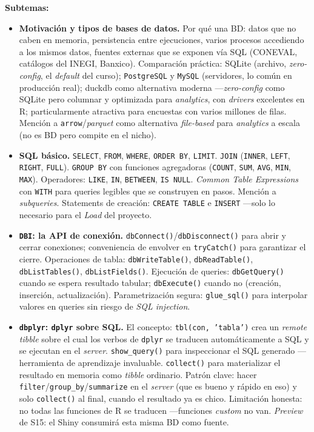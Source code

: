 \documentclass[11pt,letterpaper]{article}
\newcommand{\blue}[1]{{\color{cerulean}#1}}
\begin{document}
\textbf{Subtemas:}

\begin{itemize}[leftmargin=*, itemsep=2pt]
    \item \textbf{Motivación y tipos de bases de datos.} Por qué una BD: datos que no caben en memoria, persistencia entre ejecuciones, varios procesos accediendo a los mismos datos, fuentes externas que se exponen vía SQL (CONEVAL, catálogos del INEGI, Banxico). Comparación práctica: \blue{SQLite} (archivo, \textit{zero-config}, el \textit{default} del curso); \texttt{PostgreSQL} y \texttt{MySQL} (servidores, lo común en producción real); \blue{duckdb} como alternativa moderna ---\textit{zero-config} como SQLite pero columnar y optimizada para \textit{analytics}, con \textit{drivers} excelentes en R; particularmente atractiva para encuestas con varios millones de filas. Mención a \texttt{arrow}/\textit{parquet} como alternativa \textit{file-based} para \textit{analytics} a escala (no es BD pero compite en el nicho).
    \item \textbf{SQL básico.} \texttt{SELECT}, \texttt{FROM}, \texttt{WHERE}, \texttt{ORDER BY}, \texttt{LIMIT}. \texttt{JOIN} (\texttt{INNER}, \texttt{LEFT}, \texttt{RIGHT}, \texttt{FULL}). \texttt{GROUP BY} con funciones agregadoras (\texttt{COUNT}, \texttt{SUM}, \texttt{AVG}, \texttt{MIN}, \texttt{MAX}). Operadores: \texttt{LIKE}, \texttt{IN}, \texttt{BETWEEN}, \texttt{IS NULL}. \textit{Common Table Expressions} con \texttt{WITH} para queries legibles que se construyen en pasos. Mención a \textit{subqueries}. Statements de creación: \texttt{CREATE TABLE} e \texttt{INSERT} ---solo lo necesario para el \textit{Load} del proyecto.
    \item \textbf{\texttt{DBI}: la API de conexión.} \texttt{dbConnect()}/\texttt{dbDisconnect()} para abrir y cerrar conexiones; conveniencia de envolver en \texttt{tryCatch()} para garantizar el cierre. Operaciones de tabla: \texttt{dbWriteTable()}, \texttt{dbReadTable()}, \texttt{dbListTables()}, \texttt{dbListFields()}. Ejecución de queries: \texttt{dbGetQuery()} cuando se espera resultado tabular; \texttt{dbExecute()} cuando no (creación, inserción, actualización). Parametrización segura: \texttt{glue\_sql()} para interpolar valores en queries sin riesgo de \textit{SQL injection}.
    \item \textbf{\texttt{dbplyr}: \texttt{dplyr} sobre SQL.} El concepto: \texttt{tbl(con, 'tabla')} crea un \textit{remote tibble} sobre el cual los verbos de \texttt{dplyr} se traducen automáticamente a SQL y se ejecutan en el \textit{server}. \texttt{show\_query()} para inspeccionar el SQL generado ---herramienta de aprendizaje invaluable. \texttt{collect()} para materializar el resultado en memoria como \textit{tibble} ordinario. \blue{Patrón clave}: hacer \texttt{filter}/\texttt{group\_by}/\texttt{summarize} en el \textit{server} (que es bueno y rápido en eso) y solo \texttt{collect()} al final, cuando el resultado ya es chico. Limitación honesta: no todas las funciones de R se traducen ---funciones \textit{custom} no van.
     \textit{Preview} de S15: el Shiny consumirá esta misma BD como fuente.
\end{itemize}
\end{document}
